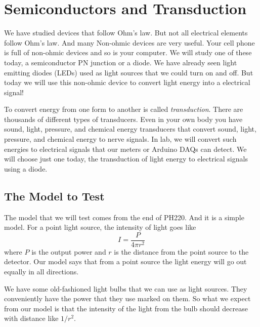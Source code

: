 \chapter{Semiconductors and Transduction}

We have studied devices that follow Ohm's law. But not all electrical 
elements follow Ohm's law. And many Non-ohmic devices are very useful. Your
cell phone is full of non-ohmic devices and so is your computer. We will
study one of these today, a semiconductor PN junction or a diode. We have
already seen light emitting diodes (LEDs) used as light sources that we
could turn on and off. But today we will use this non-ohmic device to
convert light energy into a electrical signal!

To convert energy from one form to another is called \emph{transduction}.
There are thousands of different types of transducers. Even in your own body
you have sound, light, pressure, and chemical energy transducers that
convert sound, light, pressure, and chemical energy to nerve signals. In
lab, we will convert such energies to electrical signals that our meters or
Arduino DAQs can detect. We will choose just one today, the transduction of
light energy to electrical signals using a diode.

\section{The Model to Test}

The model that we will test comes from the end of PH220. And it is a simple
model. For a point light source, the intensity of light goes like 
\begin{equation*}
	I=\frac{P}{4\pi r^{2}}
\end{equation*}%
where $P$ is the output power and $r$ is the distance from the point source
to the detector. Our model says that from a point source the light energy
will go out equally in all directions. 

We have some old-fashioned light bulbs that we can use as light sources.
They conveniently have the power that they use marked on them. So what we
expect from our model is that the intensity of the light from the bulb
should decrease with distance like $1/r^{2}.$

